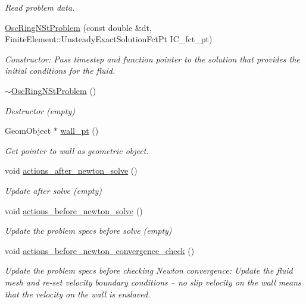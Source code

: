 \begin{DoxyCompactItemize}
\begin{DoxyCompactList}\small\item\em Read problem data. \end{DoxyCompactList}\item 
\hyperlink{classOscRingNStProblem_acd5f633c43eb4cfb43c45361ecf85e6b}{Osc\+Ring\+N\+St\+Problem} (const double \&dt, Finite\+Element\+::\+Unsteady\+Exact\+Solution\+Fct\+Pt I\+C\+\_\+fct\+\_\+pt)
\begin{DoxyCompactList}\small\item\em Constructor\+: Pass timestep and function pointer to the solution that provides the initial conditions for the fluid. \end{DoxyCompactList}\item 
\hyperlink{classOscRingNStProblem_a96e43adf75d4e33270218ceb3397443c}{$\sim$\+Osc\+Ring\+N\+St\+Problem} ()
\begin{DoxyCompactList}\small\item\em Destructor (empty) \end{DoxyCompactList}\item 
Geom\+Object $\ast$ \hyperlink{classOscRingNStProblem_a8ef3175a1869d5d2f788c68e1c090538}{wall\+\_\+pt} ()
\begin{DoxyCompactList}\small\item\em Get pointer to wall as geometric object. \end{DoxyCompactList}\item 
void \hyperlink{classOscRingNStProblem_a6e4be6a46ab263941b76ab4e6706f63a}{actions\+\_\+after\+\_\+newton\+\_\+solve} ()
\begin{DoxyCompactList}\small\item\em Update after solve (empty) \end{DoxyCompactList}\item 
void \hyperlink{classOscRingNStProblem_a7d8ff9543c042752b649ed326d6c5915}{actions\+\_\+before\+\_\+newton\+\_\+solve} ()
\begin{DoxyCompactList}\small\item\em Update the problem specs before solve (empty) \end{DoxyCompactList}\item 
void \hyperlink{classOscRingNStProblem_a98d4c847cd9d53ab3569b8418ecb0c6b}{actions\+\_\+before\+\_\+newton\+\_\+convergence\+\_\+check} ()
\begin{DoxyCompactList}\small\item\em Update the problem specs before checking Newton convergence\+: Update the fluid mesh and re-\/set velocity boundary conditions -- no slip velocity on the wall means that the velocity on the wall is enslaved. \end{DoxyCompactList}\item 

\end{DoxyCompactItemize}
